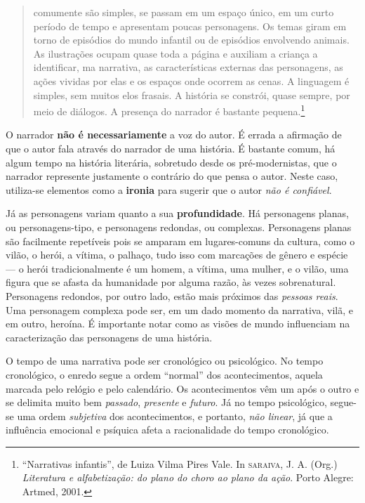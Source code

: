 \documentclass[11pt]{extarticle}
\begin{document}
\begin{quote}
comumente são simples, se passam em um espaço único, em um curto período de tempo e apresentam poucas personagens. Os temas giram em torno de episódios do mundo infantil ou de episódios envolvendo animais. As ilustrações ocupam quase toda a página e auxiliam 
a criança a identificar, ma narrativa, as características externas das personagens, as ações vividas por elas e os espaços onde ocorrem as cenas. A linguagem é simples, sem muitos elos frasais. A história se constrói, quase sempre, por meio de diálogos. A presença do narrador é bastante pequena.\footnote{“Narrativas infantis”, de Luiza Vilma Pires Vale. In \textsc{saraiva}, J. A. (Org.) \textit{Literatura e alfabetização: do plano do choro ao plano da ação}. Porto Alegre: Artmed, 2001.}  
\end{quote}

O narrador \textbf{não é necessariamente} a voz do autor. É errada a afirmação de que o autor fala através do narrador de uma história. É bastante comum, há algum tempo na história literária, sobretudo desde os pré-modernistas, que o narrador represente justamente o contrário do que pensa o autor. Neste caso, utiliza-se elementos como a \textbf{ironia} para sugerir que o autor \textit{não é confiável}.

Já as personagens variam quanto a sua \textbf{profundidade}. Há personagens planas, ou personagens-tipo, e personagens redondas, ou complexas. Personagens planas são facilmente repetíveis pois se amparam em lugares-comuns da cultura, como o vilão, o herói, a vítima, o palhaço, tudo isso com marcações de gênero e espécie --- o herói tradicionalmente é um homem, a vítima, uma mulher, e o vilão, uma figura que se afasta da humanidade por alguma razão, às vezes sobrenatural. Personagens redondos, por outro lado, estão mais próximos das \textit{pessoas reais}. Uma personagem complexa pode ser, em um dado momento da narrativa, vilã, e em outro, heroína. É importante notar como as visões de mundo influenciam na caracterização das personagens de uma história.

O tempo de uma narrativa pode ser cronológico ou psicológico. No tempo cronológico, o enredo segue a ordem ``normal'' dos acontecimentos, aquela marcada pelo relógio e pelo calendário. Os acontecimentos vêm um após o outro e se delimita muito bem \textit{passado}, \textit{presente} e \textit{futuro}. Já no tempo psicológico, segue-se uma ordem \textit{subjetiva} dos acontecimentos, e portanto, \textit{não linear}, já que a influência emocional e psíquica afeta a racionalidade do tempo cronológico. 
\end{document}

